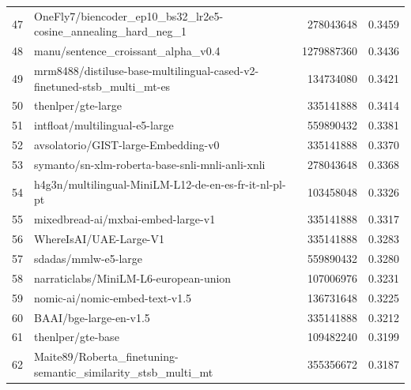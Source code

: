 {\begin{xltabular}{\textwidth}{l X rc}
    47               & OneFly7/biencoder\_ep10\_bs32\_lr2e5-cosine\_annealing\_hard\_neg\_1      & 278043648     & 0.3459       \\
    48               & manu/sentence\_croissant\_alpha\_v0.4                                      & 1279887360    & 0.3436       \\
    49               & mrm8488/distiluse-base-multilingual-cased-v2-finetuned-stsb\_multi\_mt-es  & 134734080     & 0.3421       \\
    50               & thenlper/gte-large                                                         & 335141888     & 0.3414       \\
    51               & intfloat/multilingual-e5-large                                             & 559890432     & 0.3381       \\
    52               & avsolatorio/GIST-large-Embedding-v0                                        & 335141888     & 0.3370       \\
    53               & symanto/sn-xlm-roberta-base-snli-mnli-anli-xnli                            & 278043648     & 0.3368       \\
    54               & h4g3n/multilingual-MiniLM-L12-de-en-es-fr-it-nl-pl-pt                      & 103458048     & 0.3326       \\
    55               & mixedbread-ai/mxbai-embed-large-v1                                         & 335141888     & 0.3317       \\
    56               & WhereIsAI/UAE-Large-V1                                                     & 335141888     & 0.3283       \\
    57               & sdadas/mmlw-e5-large                                                       & 559890432     & 0.3280       \\
    58               & narraticlabs/MiniLM-L6-european-union                                      & 107006976     & 0.3231       \\
    59               & nomic-ai/nomic-embed-text-v1.5                                             & 136731648     & 0.3225       \\
    60               & BAAI/bge-large-en-v1.5                                                     & 335141888     & 0.3212       \\
    61               & thenlper/gte-base                                                          & 109482240     & 0.3199       \\
    62               & Maite89/Roberta\_finetuning-semantic\_similarity\_stsb\_multi\_mt         & 355356672     & 0.3187       \\

\end{xltabular}}
